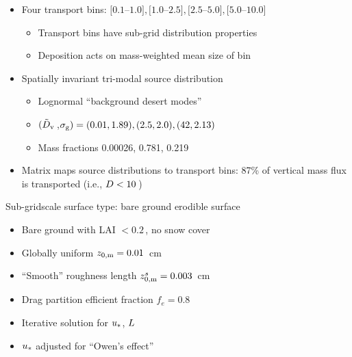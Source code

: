 \documentclass[final,dvips]{foils}
\begin{document}
\rotatefoilhead{\bgl
\Large\textcolor{blue}{\hfill Size Distribution \hfill}}\vspace{-0.5in}\large
\begin{itemize}
\item Four transport bins: $[0.1$--$1.0],[1.0$--$2.5],[2.5$--$5.0],[5.0$--$10.0]$\,\um
\begin{itemize}
\item Transport bins have sub-grid distribution properties
\item Deposition acts on mass-weighted mean size of bin
\end{itemize}
\item Spatially invariant tri-modal source distribution
\begin{itemize}
\item Lognormal ``background desert modes'' \cite[]{She84,SBG98}
\item $(\tilde{D}_{\mathrm{v}}$\,\um,$\sigma_{\mathrm{g}}) = (0.01, 1.89), (2.5, 2.0), (42, 2.13)$
\item Mass fractions 0.00026, 0.781, 0.219
\end{itemize}
\item Matrix maps source distributions to transport bins: 87\% of
vertical mass flux is transported (i.e., $D < 10$\,\um)
\end{itemize}

\rotatefoilhead{\bgl
\Large\textcolor{blue}{\hfill Mobilization \hfill}}\vspace{-0.5in}\large
Sub-gridscale surface type: bare ground erodible surface
\begin{itemize}
\item Bare ground with LAI $< 0.2$\,\mSxmS, no snow cover
\item Globally uniform $z_{0,\mathrm{m}} = 0.01$~cm
\item ``Smooth'' roughness length $z_{0,\mathrm{m}}^{s} = 0.003$~cm
\item Drag partition efficient fraction $f_e = 0.8$ \cite[]{MaB95}
\item Iterative solution for $u_{*}$, $L$ \cite[]{Bon96}
\item $u_{*}$ adjusted for ``Owen's effect'' \cite[]{GMB98}
\end{itemize}
\end{document}
